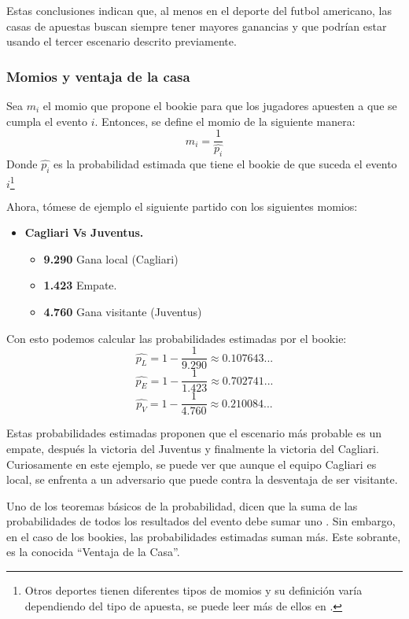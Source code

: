 Estas conclusiones indican que, al menos en el deporte del futbol americano, las casas de apuestas buscan siempre tener mayores ganancias y que podrían estar usando el tercer escenario descrito previamente. 

\subsubsection{Momios y ventaja de la casa}
Sea $m_i$ el momio que propone el bookie para que los jugadores apuesten a que se cumpla el evento $i$. Entonces, se define el momio de la siguiente manera:
\[m_i = \frac{1}{\hat{p_i}}\]
Donde $\hat{p_i}$ es la probabilidad estimada que tiene el bookie de que suceda el evento $i$\footnote{Otros deportes tienen diferentes tipos de momios y su definición varía dependiendo del tipo de apuesta, se puede leer más de ellos en \cite{ignatin1984sports}.}

Ahora, tómese de ejemplo el siguiente partido con los siguientes momios:
\begin{itemize}

\item \textbf{Cagliari Vs Juventus.}
	\begin{itemize}
		\item \textbf{9.290} Gana local (Cagliari)
		\item \textbf{1.423} Empate.
		\item \textbf{4.760} Gana visitante (Juventus)
	\end{itemize}
\end{itemize}

Con esto podemos calcular las probabilidades estimadas por el bookie:
\[\hat{p_L} = 1 - \frac{1}{9.290} \approx 0.107643...\]
\[\hat{p_E} = 1 - \frac{1}{1.423} \approx 0.702741...\]
\[\hat{p_V} = 1 - \frac{1}{4.760} \approx 0.210084...\]

Estas probabilidades estimadas proponen que el escenario más probable es un empate, después la victoria del Juventus y finalmente la victoria del Cagliari. Curiosamente en este ejemplo, se puede ver que aunque el equipo Cagliari es local, se enfrenta a un adversario que puede contra la desventaja de ser visitante.

Uno de los teoremas básicos de la probabilidad, dicen que la suma de las probabilidades de todos los resultados del evento debe sumar uno \cite{ross2006first}. Sin embargo, en el caso de los bookies, las probabilidades estimadas suman más. Este sobrante, es la conocida ``Ventaja de la Casa''.

